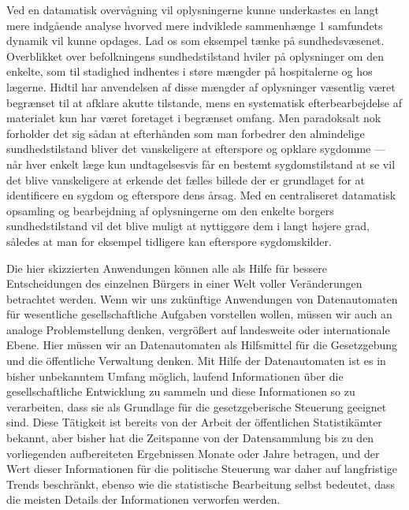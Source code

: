 {Ved en datamatisk overvågning vil oplysningerne kunne underkastes en langt mere indgående analyse hvorved mere indviklede sammenhænge 1 samfundets dynamik vil kunne opdages. Lad os som eksempel tænke på sundhedsvæsenet. Overblikket over befolkningens sundhedstilstand hviler på oplysninger om den enkelte, som til stadighed indhentes i støre mængder på hospitalerne og hos lægerne. Hidtil har anvendelsen af disse mængder af oplysninger væsentlig været begrænset til at afklare akutte tilstande, mens en systematisk efterbearbejdelse af materialet kun har været foretaget i begrænset omfang. Men paradoksalt nok forholder det sig sådan at efterhånden som man forbedrer den almindelige sundhedstilstand bliver det vanskeligere at efterspore og opklare sygdomme — når hver enkelt læge kun undtagelsesvis får en bestemt sygdomstilstand at se vil det blive vanskeligere at erkende det fælles billede der er grundlaget for at identificere en sygdom og efterspore dens årsag. Med en centraliseret datamatisk opsamling og bearbejdning af oplysningerne om den enkelte borgers sundhedstilstand vil det blive muligt at nyttiggøre dem i langt højere grad, således at man for eksempel tidligere kan efterspore sygdomskilder. 
}{
Die hier skizzierten Anwendungen können alle als Hilfe für bessere Entscheidungen des einzelnen Bürgers in einer Welt voller Veränderungen betrachtet werden. Wenn wir uns zukünftige Anwendungen von Datenautomaten für wesentliche gesellschaftliche Aufgaben vorstellen wollen, müssen wir auch an analoge Problemstellung denken, vergrößert auf landesweite oder internationale Ebene. Hier müssen wir an Datenautomaten als Hilfsmittel für die Gesetzgebung und die öffentliche Verwaltung denken. Mit Hilfe der Datenautomaten ist es in bisher unbekanntem Umfang möglich, laufend Informationen über die gesellschaftliche Entwicklung zu sammeln und diese Informationen so zu verarbeiten, dass sie als Grundlage für die gesetzgeberische Steuerung geeignet sind. Diese Tätigkeit ist bereits von der Arbeit der öffentlichen Statistikämter bekannt, aber bisher hat die Zeitspanne von der Datensammlung bis zu den vorliegenden aufbereiteten Ergebnissen Monate oder Jahre betragen, und der Wert dieser Informationen für die politische Steuerung war daher auf langfristige Trends beschränkt, ebenso wie die statistische Bearbeitung selbst bedeutet, dass die meisten Details der Informationen verworfen werden.

}
